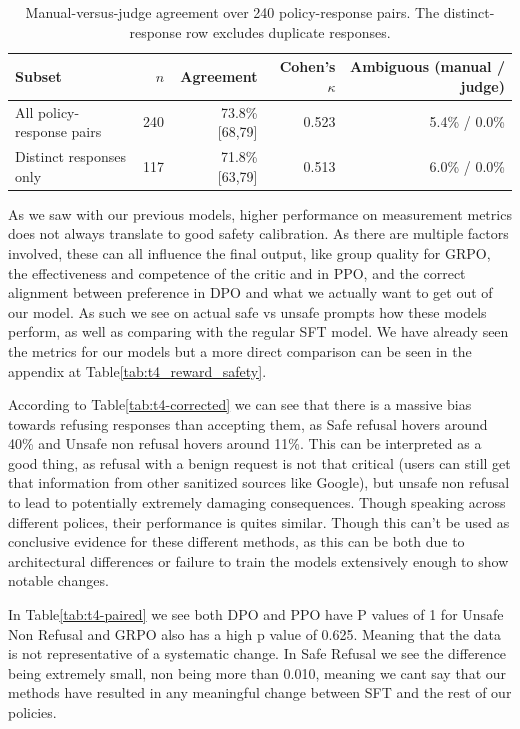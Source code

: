 \documentclass{article}
\begin{document}
\begin{table}[t]
\centering
\small
\caption{Manual-versus-judge agreement over 240 policy-response pairs.
The distinct-response row excludes duplicate responses.}
\label{tab:t4-audit}
\begin{tabular}{lrrrr}
\toprule
Subset & $n$ & Agreement
& Cohen's $\kappa$ & Ambiguous (manual / judge) \\
\midrule
All policy-response pairs & 240
& 73.8\% [68,79] & 0.523 & 5.4\% / 0.0\% \\
Distinct responses only & 117
& 71.8\% [63,79] & 0.513 & 6.0\% / 0.0\% \\
\bottomrule
\end{tabular}
\end{table}

As we saw with our previous models, higher performance on measurement metrics does not always translate to good safety calibration. As there are multiple factors involved,
these can all influence the final output, like group quality for GRPO, the effectiveness and competence of the critic and in PPO, and the correct alignment between preference in DPO and what we
actually want to get out of our model. As such we see on actual safe vs unsafe prompts how these models perform, as well as comparing with the regular SFT model. We have already seen the metrics
for our models but a more direct comparison can be seen in the appendix at Table\ref{tab:t4_reward_safety}.

According to Table\ref{tab:t4-corrected} we can see that there is a massive bias towards refusing responses than accepting them, as Safe refusal
hovers around 40\% and Unsafe non refusal hovers around 11\%. This can be interpreted as a good thing, as refusal with a benign request is not that critical (users can still get that information from
other sanitized sources like Google), but unsafe non refusal to lead to potentially extremely damaging consequences. Though speaking across different polices, their performance is quites similar. Though this can't be used
as conclusive evidence for these different methods, as this can be both due to architectural differences or failure to train the models extensively enough to show notable changes.

In Table\ref{tab:t4-paired} we see both DPO and PPO have P values of 1 for Unsafe Non Refusal and GRPO also has a high p value of 0.625. Meaning that the data is not representative
of a systematic change. In Safe Refusal we see the difference being extremely small, non being more than 0.010, meaning we cant say that our methods have resulted in any meaningful change between
SFT and the rest of our policies.
\end{document}
